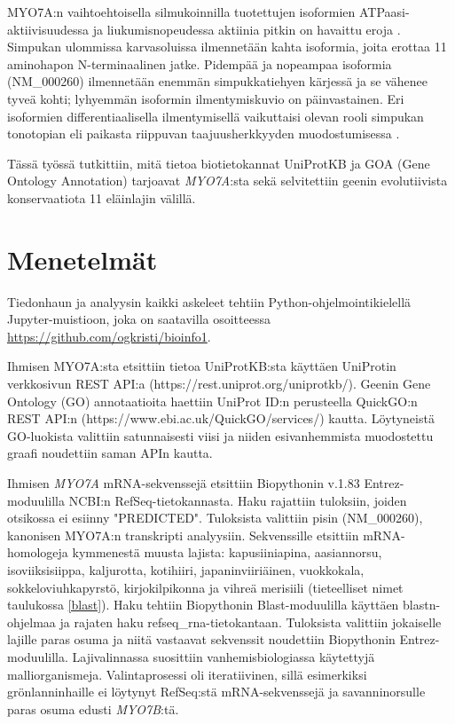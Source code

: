 \documentclass[a4paper,11pt,notitlepage]{article}
\begin{document}
MYO7A:n vaihtoehtoisella silmukoinnilla tuotettujen isoformien ATPaasi-aktiivisuudessa ja liukumisnopeudessa aktiinia pitkin on havaittu eroja \cite{hollo2023}. Simpukan ulommissa karvasoluissa ilmennetään kahta isoformia, joita erottaa 11 aminohapon N-terminaalinen jatke. Pidempää ja nopeampaa isoformia (NM\_000260) ilmennetään enemmän simpukkatiehyen kärjessä ja se vähenee tyveä kohti; lyhyemmän isoformin ilmentymiskuvio on päinvastainen. Eri isoformien differentiaalisella ilmentymisellä vaikuttaisi olevan rooli simpukan tonotopian eli paikasta riippuvan taajuusherkkyyden muodostumisessa \cite{hollo2023}.

Tässä työssä tutkittiin, mitä tietoa biotietokannat UniProtKB ja GOA (Gene Ontology Annotation) tarjoavat \textit{MYO7A}:sta sekä selvitettiin geenin evolutiivista konservaatiota 11 eläinlajin välillä.

\section{Menetelmät}
Tiedonhaun ja analyysin kaikki askeleet tehtiin Python-ohjelmointikielellä Jupyter-muistioon, joka on saatavilla osoitteessa \url{https://github.com/ogkristi/bioinfo1}.

Ihmisen MYO7A:sta etsittiin tietoa UniProtKB:sta käyttäen UniProtin verkkosivun REST API:a (https://rest.uniprot.org/uniprotkb/). Geenin Gene Ontology (GO) annotaatioita haettiin UniProt ID:n perusteella QuickGO:n REST API:n (https://www.ebi.ac.uk/QuickGO/services/) kautta. Löytyneistä GO-luokista valittiin satunnaisesti viisi ja niiden esivanhemmista muodostettu graafi noudettiin saman APIn kautta.

Ihmisen \textit{MYO7A} mRNA-sekvenssejä etsittiin Biopythonin v.1.83 \cite{biopython} Entrez-moduulilla NCBI:n RefSeq-tietokannasta. Haku rajattiin tuloksiin, joiden otsikossa ei esiinny "PREDICTED". Tuloksista valittiin pisin (NM\_000260), kanonisen MYO7A:n transkripti analyysiin. Sekvenssille etsittiin mRNA-homologeja kym\-menestä muusta lajista: kapusiiniapina, aasiannorsu, isoviiksisiippa, kaljurotta, kotihiiri, japaninviiriäinen, vuokkokala, sokkeloviuhkapyrstö, kirjokilpikonna ja vihreä merisiili (tieteelliset nimet taulukossa \ref{blast}). Haku tehtiin Biopythonin Blast-moduulilla käyttäen blastn-ohjelmaa ja rajaten haku refseq\_rna-tieto\-kantaan. Tuloksista valittiin jokaiselle lajille paras osuma ja niitä vastaavat sekvenssit noudettiin Biopythonin Entrez-moduulilla. Lajivalinnassa suosittiin vanhemisbiologiassa käytettyjä malliorganismeja. Valintaprosessi oli iteratiivinen, sillä esimerkiksi grönlanninhaille ei löytynyt RefSeq:stä mRNA-sekvenssejä ja savanninorsulle paras osuma edusti \textit{MYO7B}:tä. 
\end{document}
